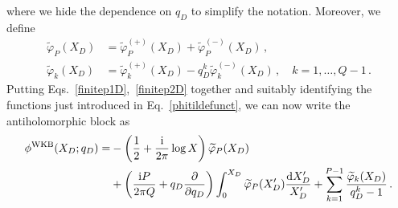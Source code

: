 \documentclass[a4paper,11pt]{article}
\theoremstyle{definition}
\newcommand{\ri}{{\rm i}}
\newcommand{\rd}{{\rm d}}
\newcommand{\be}{\begin{equation}}
\newcommand{\ee}{\end{equation}}
\newcommand{\ba}{\begin{aligned}}
\newcommand{\ea}{\end{aligned}}
\begin{document}
%
where we hide the dependence on $q_D$ to simplify the notation. Moreover, we define
%
\begin{subequations} \label{phitildefunct}
\begin{align}
\widetilde  \varphi_P(X_D)&=  \widetilde \varphi^{(+)}_P(X_D) + \widetilde \varphi^{(-)}_P(X_D)  \, , \\
\widetilde  \varphi_k(X_D)&=  \widetilde \varphi^{(+)}_k(X_D) - q_D^k \widetilde \varphi^{(-)}_k(X_D) \, , \quad k=1, \dots, Q-1 \, .
\end{align}
\end{subequations}
%
Putting Eqs.~\eqref{finitep1D},~\eqref{finitep2D} together and suitably identifying the functions just introduced in Eq.~\eqref{phitildefunct}, we can now write the antiholomorphic block as
%
\be \label{phiratD}
\ba
\phi^{\rm WKB}(X_D;q_D)=& -\left( {1\over 2} + {\ri \over 2 \pi} \log X \right) \widetilde \varphi_P(X_D) \\
&+ \left({\ri P \over 2 \pi Q} + q_D{\partial \over \partial q_D} \right) \int_0^{X_D} \widetilde \varphi_P(X_D') {\rd X_D' \over X_D'} + \sum_{k=1}^{P-1} { \widetilde \varphi_k(X_D)\over q_D^k-1} \, .
\ea
\ee
\end{document}
